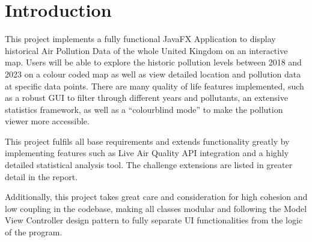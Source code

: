 \documentclass[../main.tex]{subfiles}
\begin{document}
\section{Introduction}

\noindent This project implements a fully functional JavaFX Application to display historical Air Pollution Data of the whole
United Kingdom on an interactive map. Users will be able to explore the historic pollution levels between 2018 and 2023
on a colour coded map as well as view detailed location and pollution data at specific data points. There are many
quality of life features implemented, such as a robust GUI to filter through different years and pollutants, an extensive 
statistics framework, as well as a “colourblind mode” to make the pollution viewer more accessible. 

\noindent This project fulfils all base requirements and extends functionality greatly by implementing features such as
Live Air Quality API integration and a highly detailed statistical analysis tool. The challenge extensions are
listed in greater detail in the report. 

\noindent Additionally, this project takes great care and consideration for high cohesion and low coupling in the codebase,
making all classes modular and following the Model View Controller design pattern to fully separate UI
functionalities from the logic of the program.
\end{document}
